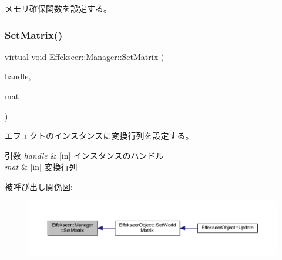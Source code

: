 メモリ確保関数を設定する。 

\mbox{\label{class_effekseer_1_1_manager_a69d0768ed69c30d3993ececa6159c4dd}} 
\subsubsection{\texorpdfstring{Set\+Matrix()}{SetMatrix()}}
{\footnotesize\ttfamily virtual \mbox{\hyperlink{namespace_effekseer_ab34c4088e512200cf4c2716f168deb56}{void}} Effekseer\+::\+Manager\+::\+Set\+Matrix (\begin{DoxyParamCaption}\item[{\mbox{\hyperlink{namespace_effekseer_afba58b8d812da862190e9bbfc040824a}{Handle}}}]{handle,  }\item[{const \mbox{\hyperlink{struct_effekseer_1_1_matrix43}{Matrix43}} \&}]{mat }\end{DoxyParamCaption})\hspace{0.3cm}{\ttfamily [pure virtual]}}



エフェクトのインスタンスに変換行列を設定する。 


\begin{DoxyParams}{引数}
{\em handle} & \mbox{[}in\mbox{]} インスタンスのハンドル \\
\hline
{\em mat} & \mbox{[}in\mbox{]} 変換行列 \\
\hline
\end{DoxyParams}
被呼び出し関係図\+:\nopagebreak
\begin{figure}[H]
\begin{center}
\leavevmode
\includegraphics[width=350pt]{class_effekseer_1_1_manager_a69d0768ed69c30d3993ececa6159c4dd_icgraph}
\end{center}
\end{figure}
\mbox{\label{class_effekseer_1_1_manager_a994104b9b353a09861d27ec87b09fa1c}} 
